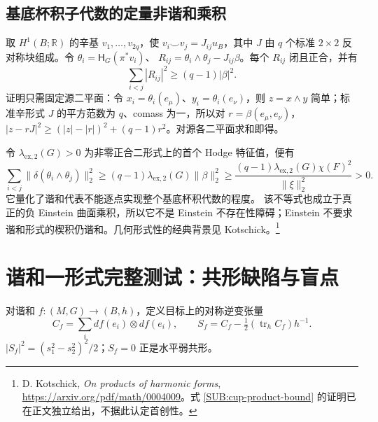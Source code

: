 \documentclass[UTF8,fontset=fandol,zihao=-4,oneside,openany]{ctexbook}
\theoremstyle{cjkplain}
\numberwithin{equation}{chapter}
\begin{document}
\subsection{基底杯积子代数的定量非谐和乘积}

取 $H^1(B;\mathbb R)$ 的辛基 $v_1,\ldots,v_{2q}$，使
$v_i\smile v_j=J_{ij}u_B$，其中 $J$ 由 $q$ 个标准 $2\times2$ 反对称块组成。令
$\theta_i=\mathsf H_G(\pi^*v_i)$、
$R_{ij}=\theta_i\wedge\theta_j-J_{ij}\beta$。每个 $R_{ij}$ 闭且正合，并有
\begin{equation}\label{SUB:cup-product-bound}
\sum_{i<j}|R_{ij}|^2\ge(q-1)|\beta|^2.
\end{equation}
证明只需固定源二平面：令 $x_i=\theta_i(e_\mu)$、$y_i=\theta_i(e_\nu)$，则 $z=x\wedge y$ 简单；标准辛形式 $J$ 的平方范数为 $q$、comass 为一，所以对 $r=\beta(e_\mu,e_\nu)$，
$|z-rJ|^2\ge(|z|-|r|)^2+(q-1)r^2$。对源各二平面求和即得。

令 $\lambda_{\mathrm{ex},2}(G)>0$ 为非零正合二形式上的首个 Hodge 特征值，便有
\begin{equation}\label{SUB:cup-codifferential}
\sum_{i<j}\|\delta(\theta_i\wedge\theta_j)\|_2^2
\ge(q-1)\lambda_{\mathrm{ex},2}(G)\|\beta\|_2^2
\ge\frac{(q-1)\lambda_{\mathrm{ex},2}(G)\chi(F)^2}{\|\xi\|_2^2}>0.
\end{equation}
它量化了谐和代表不能逐点实现整个基底杯积代数的程度。
该不等式也成立于真正的负 Einstein 曲面乘积，所以它不是 Einstein 不存在性障碍；Einstein 不要求谐和形式的楔积仍谐和。几何形式性的经典背景见 Kotschick。\footnote{D. Kotschick, \emph{On products of harmonic forms}, \url{https://arxiv.org/pdf/math/0004009}。式 \eqref{SUB:cup-product-bound} 的证明已在正文独立给出，不据此认定首创性。}

\section{谐和一形式完整测试：共形缺陷与盲点}

对谐和 $f:(M,G)\to(B,h)$，定义目标上的对称逆变张量
\[
C_f=\sum_i df(e_i)\otimes df(e_i),\qquad
S_f=C_f-\tfrac12(\operatorname{tr}_hC_f)h^{-1}.
\]
$|S_f|^2=(s_1^2-s_2^2)^2/2$；$S_f=0$ 正是水平弱共形。
\end{document}
